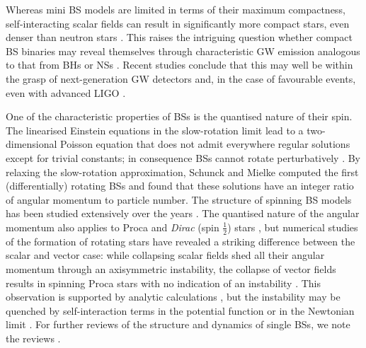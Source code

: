 Whereas mini BS models are limited in terms of their maximum
compactness, self-interacting scalar fields
can result in significantly more compact stars, even
denser than neutron stars
\cite{Colpi:1986ye,Lee:1986ts,Schunck:1999zu,Hartmann:2012da}. This raises the intriguing
question whether compact BS binaries may reveal themselves
through characteristic GW emission analogous to that from
BHs or NSs \cite{Bustillo:2020syj}. Recent studies
conclude that this may well be within the grasp of
next-generation GW detectors and, in the case of favourable
events, even with advanced LIGO
\cite{Sennett:2017etc,DiGiovanni:2020ror,Toubiana:2020lzd}.

One of the characteristic properties of BSs is
the quantised nature of their spin. The linearised
Einstein equations in the slow-rotation limit lead
to a two-dimensional Poisson equation that does not
admit everywhere regular solutions except for trivial
constants; in consequence BSs cannot rotate perturbatively
\cite{Kobayashi:1994qi}. By relaxing the slow-rotation
approximation, Schunck and Mielke \cite{Schunck:1996he}
computed the first (differentially) rotating BSs
and found that these solutions have an integer
ratio of angular momentum to particle number. The
structure of spinning BS models has been studied extensively
over the years \cite{Ryan:1996nk,Yoshida:1997jq,Yoshida:1997qf,Yoshida:1997nd,Schunck:1999pm,Kleihaus:2005me,Kleihaus:2007vk,Kleihaus:2011sx,Collodel:2017biu}. The quantised nature
of the angular momentum also applies to Proca and
{\it Dirac} (spin $\tfrac{1}{2}$) stars
\cite{Herdeiro:2019mbz}, but numerical studies of the formation
of rotating stars have revealed a striking difference
between the scalar and vector case: while collapsing
scalar fields shed all their angular momentum through an
axisymmetric instability, the collapse of vector fields
results in spinning Proca stars with no indication of an
instability \cite{Sanchis-Gual:2019ljs,DiGiovanni:2020ror}.
This observation is supported by analytic calculations
\cite{Dmitriev:2021utv}, but the instability
may be quenched by self-interaction
terms in the potential function or in the Newtonian limit
\cite{Siemonsen:2020hcg}.
For further reviews of the structure and dynamics of single BSs,
we note the reviews
\cite{Mielke:1997re,Mielke:2000mh,Mundim:2010hi,Liebling:2012fv}.


